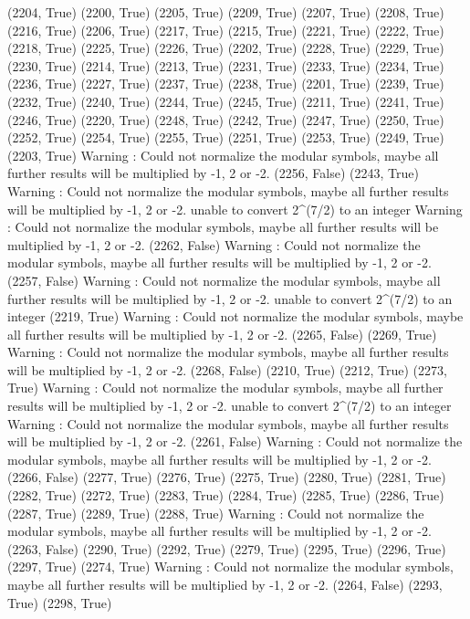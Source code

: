 (2204, True)
(2200, True)
(2205, True)
(2209, True)
(2207, True)
(2208, True)
(2216, True)
(2206, True)
(2217, True)
(2215, True)
(2221, True)
(2222, True)
(2218, True)
(2225, True)
(2226, True)
(2202, True)
(2228, True)
(2229, True)
(2230, True)
(2214, True)
(2213, True)
(2231, True)
(2233, True)
(2234, True)
(2236, True)
(2227, True)
(2237, True)
(2238, True)
(2201, True)
(2239, True)
(2232, True)
(2240, True)
(2244, True)
(2245, True)
(2211, True)
(2241, True)
(2246, True)
(2220, True)
(2248, True)
(2242, True)
(2247, True)
(2250, True)
(2252, True)
(2254, True)
(2255, True)
(2251, True)
(2253, True)
(2249, True)
(2203, True)
Warning : Could not normalize the modular symbols, maybe all further results will be multiplied by -1, 2 or -2.
(2256, False)
(2243, True)
Warning : Could not normalize the modular symbols, maybe all further results will be multiplied by -1, 2 or -2.
unable to convert 2^(7/2) to an integer
Warning : Could not normalize the modular symbols, maybe all further results will be multiplied by -1, 2 or -2.
(2262, False)
Warning : Could not normalize the modular symbols, maybe all further results will be multiplied by -1, 2 or -2.
(2257, False)
Warning : Could not normalize the modular symbols, maybe all further results will be multiplied by -1, 2 or -2.
unable to convert 2^(7/2) to an integer
(2219, True)
Warning : Could not normalize the modular symbols, maybe all further results will be multiplied by -1, 2 or -2.
(2265, False)
(2269, True)
Warning : Could not normalize the modular symbols, maybe all further results will be multiplied by -1, 2 or -2.
(2268, False)
(2210, True)
(2212, True)
(2273, True)
Warning : Could not normalize the modular symbols, maybe all further results will be multiplied by -1, 2 or -2.
unable to convert 2^(7/2) to an integer
Warning : Could not normalize the modular symbols, maybe all further results will be multiplied by -1, 2 or -2.
(2261, False)
Warning : Could not normalize the modular symbols, maybe all further results will be multiplied by -1, 2 or -2.
(2266, False)
(2277, True)
(2276, True)
(2275, True)
(2280, True)
(2281, True)
(2282, True)
(2272, True)
(2283, True)
(2284, True)
(2285, True)
(2286, True)
(2287, True)
(2289, True)
(2288, True)
Warning : Could not normalize the modular symbols, maybe all further results will be multiplied by -1, 2 or -2.
(2263, False)
(2290, True)
(2292, True)
(2279, True)
(2295, True)
(2296, True)
(2297, True)
(2274, True)
Warning : Could not normalize the modular symbols, maybe all further results will be multiplied by -1, 2 or -2.
(2264, False)
(2293, True)
(2298, True)
